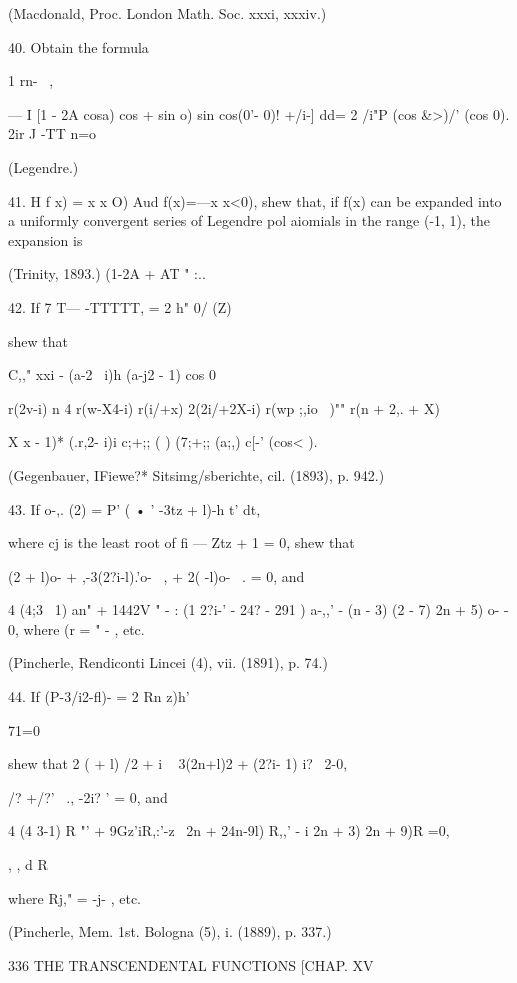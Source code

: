 {{{{(Macdonald, Proc. London Math. Soc. xxxi, xxxiv.)

40. Obtain the formula

1 rn- \ ,

— I [1 - 2A cosa) cos + sin o) sin cos(0'- 0)! +/i-] dd= 2 /i"P (cos
\&>)/' (cos 0). 2ir J -TT n=o

(Legendre.)

41. H f x) = x x O) Aud f(x)=—x x<0), shew that, if f(x) can be
expanded into a uniformly convergent series of Legendre pol aiomials
in the range (-1, 1), the expansion is

(Trinity, 1893.) (1-2A + AT " :..



42. If 7 T— -TTTTT, = 2 h" 0/ (Z)



shew that



C,," xxi - (a-2 \ i)h (a-j2 - 1) cos 0



  r(2v-i) n 4 r(w-X4-i) r(i/+x) 2(2i/+2X-i) r(wp ;,io ~)"" r(n + 2,. +
X)

X x - 1)* (.r,2- i)i c;+;; ( ) (7;+;; (a;,) c[-' (cos< ).

(Gegenbauer, IFiewe?* Sitsimg/sberichte, cil. (1893), p. 942.)

43. If o-,. (2) = P' ( • ' -3tz + l)-h t' dt,

where cj is the least root of fi — Ztz + 1 = 0, shew that

(2 + l)o- + ,-3(2?i-l).'o- \ , + 2( -l)o- \ . = 0, and

4 (4;3 \ 1) an" + 1442V " - : (1 2?i-' - 24? - 291 ) a-,,' - (n - 3)
(2 - 7) 2n + 5) o- - 0, where (r = " - , etc.

(Pincherle, Rendiconti Lincei (4), vii. (1891), p. 74.)

44. If (P-3/i2-fl)- = 2 Rn z)h'\

71=0

shew that 2 ( + l) /2 + i ~ 3(2n+l)2 + (2?i- 1) i? \ 2-0,

 /? +/?' \ ., -2i? ' = 0, and

4 (4 3-1) R "' + 9Gz'iR,:'-z \ 2n + 24n-9l) R,,' - i 2n + 3) 2n + 9)R
=0,

, , d R

where Rj," = -j- , etc.

(Pincherle, Mem. 1st. Bologna (5), i. (1889), p. 337.)



336 THE TRANSCENDENTAL FUNCTIONS [CHAP. XV

}}}}
